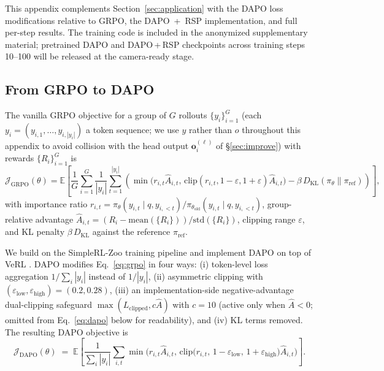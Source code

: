This appendix complements Section~\ref{sec:application} with the DAPO loss modifications relative to GRPO, the DAPO~+~RSP implementation, and full per-step results. The training code is included in the anonymized supplementary material; pretrained DAPO and DAPO\,+\,RSP checkpoints across training steps 10--100 will be released at the camera-ready stage.

\subsection{From GRPO to DAPO}\label{app:grpo}

The vanilla GRPO objective \citep{shao2024deepseekmath} for a group of $G$ rollouts $\{y_i\}_{i=1}^G$ (each $y_i = (y_{i,1},\dots,y_{i,|y_i|})$ a token sequence; we use $y$ rather than $o$ throughout this appendix to avoid collision with the head output $\mathbf{o}_i^{(\ell)}$ of \S\ref{sec:improve}) with rewards $\{R_i\}_{i=1}^G$ is
\begin{equation}\label{eq:grpo}
\mathcal{J}_{\text{GRPO}}(\theta) = \mathbb{E}\!\left[\frac{1}{G}\sum_{i=1}^{G}\frac{1}{|y_i|}\sum_{t=1}^{|y_i|}\!\left(\min\!\big(r_{i,t}\hat{A}_{i,t},\,\text{clip}(r_{i,t},1{-}\varepsilon,1{+}\varepsilon)\hat{A}_{i,t}\big) - \beta\,D_{\text{KL}}(\pi_\theta\|\pi_{\text{ref}})\right)\right],
\end{equation}
with importance ratio $r_{i,t} = \pi_\theta(y_{i,t}\mid q,y_{i,<t})/\pi_{\theta_{\text{old}}}(y_{i,t}\mid q,y_{i,<t})$, group-relative advantage $\hat{A}_{i,t} = (R_i - \mathrm{mean}(\{R_i\}))/\mathrm{std}(\{R_i\})$, clipping range $\varepsilon$, and KL penalty $\beta\,D_{\text{KL}}$ against the reference $\pi_{\text{ref}}$.

We build on the SimpleRL-Zoo \citep{zeng2025simplerl} training pipeline and implement DAPO on top of VeRL \citep{sheng2024hybridflow}. DAPO modifies Eq.~\eqref{eq:grpo} in four ways: (i) token-level loss aggregation $1/\sum_i|y_i|$ instead of $1/|y_i|$, (ii) asymmetric clipping with $(\varepsilon_{\text{low}},\varepsilon_{\text{high}})=(0.2,0.28)$, (iii) an implementation-side negative-advantage dual-clipping safeguard $\max(L_{\text{clipped}},c\hat{A})$ with $c=10$ (active only when $\hat{A}<0$; omitted from Eq.~\eqref{eq:dapo} below for readability), and (iv) KL terms removed. The resulting DAPO objective is
\begin{equation}\label{eq:dapo}
\mathcal{J}_{\text{DAPO}}(\theta)
\;=\;
\mathbb{E}\!\left[
\frac{1}{\sum_i|y_i|}
\sum_{i,t}
\min\!\Big(r_{i,t}\hat{A}_{i,t},\,
\text{clip}\big(r_{i,t},\,1{-}\varepsilon_{\text{low}},\,1{+}\varepsilon_{\text{high}}\big)\hat{A}_{i,t}\Big)
\right].
\end{equation}

